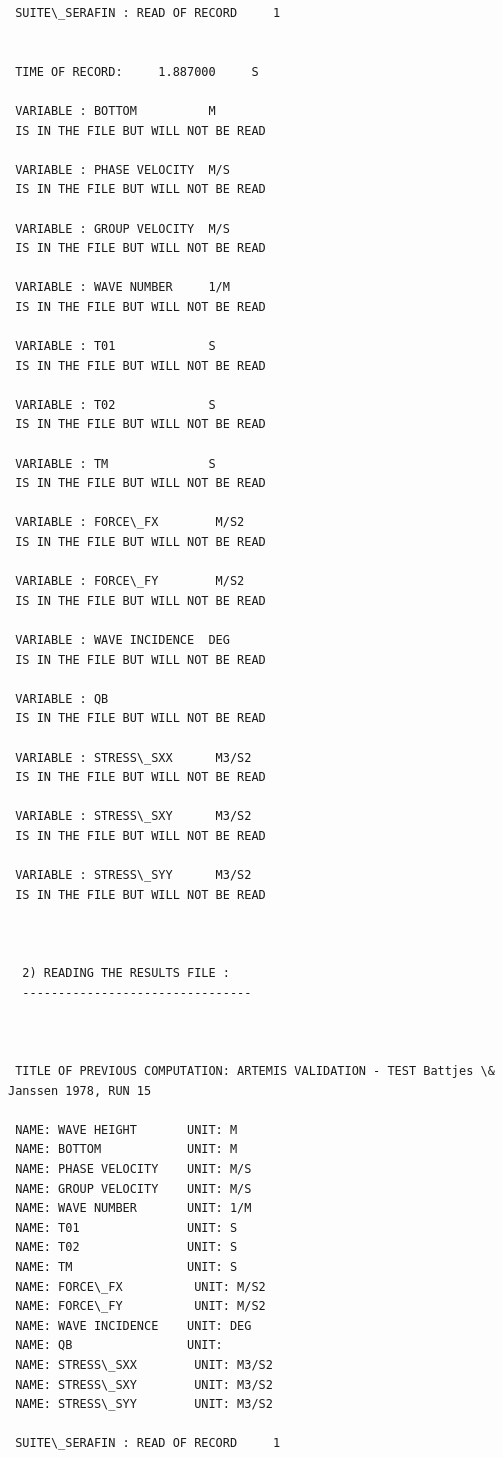 \begin{verbatim}
 SUITE\_SERAFIN : READ OF RECORD     1


 TIME OF RECORD:     1.887000     S

 VARIABLE : BOTTOM          M
 IS IN THE FILE BUT WILL NOT BE READ

 VARIABLE : PHASE VELOCITY  M/S
 IS IN THE FILE BUT WILL NOT BE READ

 VARIABLE : GROUP VELOCITY  M/S
 IS IN THE FILE BUT WILL NOT BE READ

 VARIABLE : WAVE NUMBER     1/M
 IS IN THE FILE BUT WILL NOT BE READ

 VARIABLE : T01             S
 IS IN THE FILE BUT WILL NOT BE READ

 VARIABLE : T02             S
 IS IN THE FILE BUT WILL NOT BE READ

 VARIABLE : TM              S
 IS IN THE FILE BUT WILL NOT BE READ

 VARIABLE : FORCE\_FX        M/S2
 IS IN THE FILE BUT WILL NOT BE READ

 VARIABLE : FORCE\_FY        M/S2
 IS IN THE FILE BUT WILL NOT BE READ

 VARIABLE : WAVE INCIDENCE  DEG
 IS IN THE FILE BUT WILL NOT BE READ

 VARIABLE : QB
 IS IN THE FILE BUT WILL NOT BE READ

 VARIABLE : STRESS\_SXX      M3/S2
 IS IN THE FILE BUT WILL NOT BE READ

 VARIABLE : STRESS\_SXY      M3/S2
 IS IN THE FILE BUT WILL NOT BE READ

 VARIABLE : STRESS\_SYY      M3/S2
 IS IN THE FILE BUT WILL NOT BE READ



  2) READING THE RESULTS FILE :
  --------------------------------



 TITLE OF PREVIOUS COMPUTATION: ARTEMIS VALIDATION - TEST Battjes \& Janssen 1978, RUN 15

 NAME: WAVE HEIGHT       UNIT: M
 NAME: BOTTOM            UNIT: M
 NAME: PHASE VELOCITY    UNIT: M/S
 NAME: GROUP VELOCITY    UNIT: M/S
 NAME: WAVE NUMBER       UNIT: 1/M
 NAME: T01               UNIT: S
 NAME: T02               UNIT: S
 NAME: TM                UNIT: S
 NAME: FORCE\_FX          UNIT: M/S2
 NAME: FORCE\_FY          UNIT: M/S2
 NAME: WAVE INCIDENCE    UNIT: DEG
 NAME: QB                UNIT:
 NAME: STRESS\_SXX        UNIT: M3/S2
 NAME: STRESS\_SXY        UNIT: M3/S2
 NAME: STRESS\_SYY        UNIT: M3/S2

 SUITE\_SERAFIN : READ OF RECORD     1



\end{verbatim}
